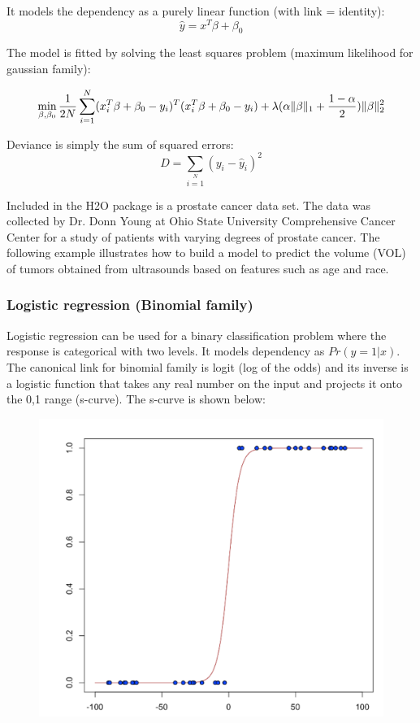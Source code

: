 It models the dependency as a purely linear function (with link = identity):
\[ \hat{y} = x^T\beta + \beta_0\]

The model is fitted by solving the least squares problem (maximum likelihood for gaussian family):

\[ \min\limits_{\beta,\beta_0} { {1 \over 2N}\sum\limits_{i=1}\limits^{N}(x_i^{T}\beta  + \beta_0- y_i)^T (x_i^{T}\beta + \beta_0 - y_i)  + \lambda (\alpha \|\beta \|_1 + {1-\alpha \over 2}) \| \beta \|_2^2} \]

Deviance is simply the sum of squared errors:
\[ D = \sum\limits_{i=1}\limits^{N}{(y_i - \hat{y}_i)^2} \]

\waterExampleInR

Included in the H2O package is a prostate cancer data set. The data was collected by Dr. Donn Young at Ohio State
University Comprehensive Cancer Center for a study of patients with varying degrees of prostate cancer. The
following example illustrates how to build a model to predict the volume (VOL) of tumors obtained from ultrasounds
based on features such as age and race.



\subsubsection{Logistic regression (Binomial family)}
Logistic regression can be used for a binary classification problem where the response is categorical with two
levels. It models dependency as $Pr(y = 1|x)$. The canonical link for binomial family is logit (log of the odds)
and its inverse is a logistic function that takes any real number on the input and projects it onto the 0,1 range
(s-curve).  The s-curve is shown below:

\begin{figure}[h]
\centering
\includegraphics[scale=0.5]{images/scurve.png}
\end{figure}

